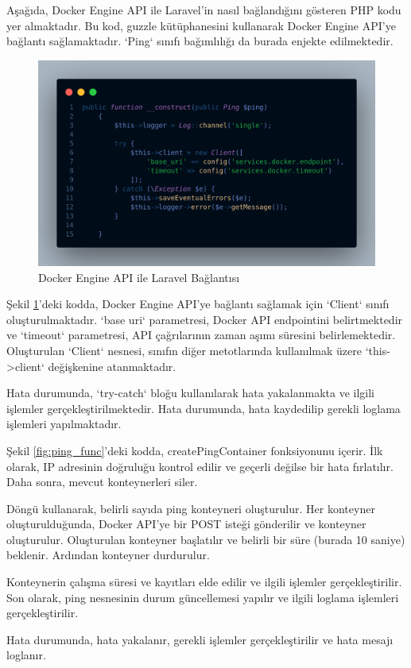 Aşağıda, Docker Engine API ile Laravel'in nasıl bağlandığını gösteren PHP kodu yer almaktadır. Bu kod, guzzle kütüphanesini kullanarak Docker Engine API'ye bağlantı sağlamaktadır. `Ping` sınıfı bağımlılığı da burada enjekte edilmektedir.

\begin{figure}[ht]
	\centering
	\includegraphics[width=0.7\linewidth]{images/code_construct.png}
	\caption{Docker Engine API ile Laravel Bağlantısı}
	\label{fig:ping_construct}
\end{figure}

Şekil \ref{fig:ping_construct}'deki kodda, Docker Engine API'ye bağlantı sağlamak için `Client` sınıfı oluşturulmaktadır. `base uri` parametresi, Docker API endpointini belirtmektedir ve `timeout` parametresi, API çağrılarının zaman aşımı süresini belirlemektedir. Oluşturulan `Client` nesnesi, sınıfın diğer metotlarında kullanılmak üzere `this->client` değişkenine atanmaktadır.

Hata durumunda, `try-catch` bloğu kullanılarak hata yakalanmakta ve ilgili işlemler gerçekleştirilmektedir. Hata durumunda, hata kaydedilip gerekli loglama işlemleri yapılmaktadır.

Şekil \ref{fig:ping_func}'deki kodda, createPingContainer fonksiyonunu içerir. İlk olarak, IP adresinin doğruluğu kontrol edilir ve geçerli değilse bir hata fırlatılır. Daha sonra, mevcut konteynerleri siler.

Döngü kullanarak, belirli sayıda ping konteyneri oluşturulur. Her konteyner oluşturulduğunda, Docker API'ye bir POST isteği gönderilir ve konteyner oluşturulur. Oluşturulan konteyner başlatılır ve belirli bir süre (burada 10 saniye) beklenir. Ardından konteyner durdurulur.

Konteynerin çalışma süresi ve kayıtları elde edilir ve ilgili işlemler gerçekleştirilir. Son olarak, ping nesnesinin durum güncellemesi yapılır ve ilgili loglama işlemleri gerçekleştirilir.

Hata durumunda, hata yakalanır, gerekli işlemler gerçekleştirilir ve hata mesajı loglanır.

